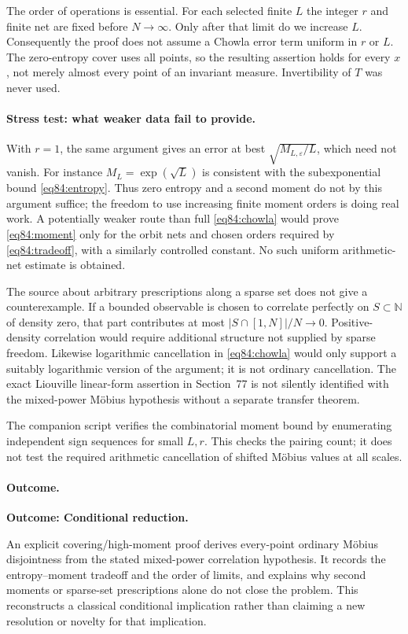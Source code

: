\documentclass[11pt,a4paper]{article}
\numberwithin{equation}{section}
\newcommand{\N}{\mathbb{N}}
\begin{document}
The order of operations is essential. For each selected finite $L$ the
integer $r$ and finite net are fixed before $N\to\infty$. Only after that
limit do we increase $L$. Consequently the proof does not assume a
Chowla error term uniform in $r$ or $L$. The zero-entropy cover uses all
points, so the resulting assertion holds for every $x$, not merely almost
every point of an invariant measure. Invertibility of $T$ was never used.

\paragraph{Stress test: what weaker data fail to provide.}
With $r=1$, the same argument gives an error at best
$\sqrt{M_{L,\varepsilon}/L}$, which need not vanish. For instance
$M_L=\exp(\sqrt L)$ is consistent with the subexponential bound
\eqref{eq84:entropy}. Thus zero entropy and a second moment do not by
this argument suffice; the freedom to use increasing finite moment orders
is doing real work. A potentially weaker route than full
\eqref{eq84:chowla} would prove \eqref{eq84:moment} only for the orbit
nets and chosen orders required by \eqref{eq84:tradeoff}, with a similarly
controlled constant. No such uniform arithmetic-net estimate is obtained.

The source about arbitrary prescriptions along a sparse set does not give
a counterexample. If a bounded observable is chosen to correlate perfectly
on $S\subset\N$ of density zero, that part contributes at most
$|S\cap[1,N]|/N\to0$. Positive-density correlation would require additional
structure not supplied by sparse freedom. Likewise logarithmic cancellation
in \eqref{eq84:chowla} would only support a suitably logarithmic version
of the argument; it is not ordinary cancellation. The exact Liouville
linear-form assertion in Section~77 is not silently identified with the
mixed-power M\"obius hypothesis without a separate transfer theorem.

The companion script verifies the combinatorial moment bound by enumerating
independent sign sequences for small $L,r$. This checks the pairing count;
it does not test the required arithmetic cancellation of shifted M\"obius
values at all scales.

\paragraph{Outcome.}
\textbf{Outcome: Conditional reduction.}

An explicit covering/high-moment proof derives every-point ordinary
M\"obius disjointness from the stated mixed-power correlation hypothesis.
It records the entropy--moment tradeoff and the order of limits, and
explains why second moments or sparse-set prescriptions alone do not close
the problem. This reconstructs a classical conditional implication rather
than claiming a new resolution or novelty for that implication.
\end{document}
